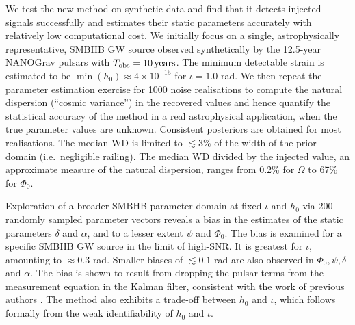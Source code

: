 \documentclass[fleqn,usenatbib,useAMS]{mnras}
\begin{document}
 We test the new method on synthetic data and find that it detects injected signals successfully and estimates their static parameters accurately with relatively low computational cost. We initially focus on a single, astrophysically representative, SMBHB GW source observed synthetically by the 12.5-year NANOGrav pulsars with $T_{\rm obs} = 10 \, {\rm years}$. The minimum detectable strain is estimated to be $\min(h_0) \approx 4 \times 10^{-15}$ for $\iota=1.0$ rad. We then repeat the parameter estimation exercise for 1000 noise realisations to compute the natural dispersion (``cosmic variance'') in the recovered values and hence quantify the statistical accuracy of the method in a real astrophysical application, when the true parameter values are unknown. Consistent posteriors are obtained for most realisations. The median WD is limited to $\lesssim 3\%$ of the width of the prior domain (i.e.\ negligible railing). The median WD divided by the injected value, an approximate measure of the natural dispersion, ranges from  0.2\% for $\Omega$ to 67\% for $\Phi_0$. \newline 
  
  
Exploration of a broader SMBHB parameter domain at fixed $\iota$ and $h_0$ via 200 randomly sampled parameter vectors reveals a bias in the estimates of the static parameters $\delta$ and $\alpha$, and to a lesser extent $\psi$ and $\Phi_0$. The bias is examined for a specific SMBHB GW source in the limit of high-SNR. It is greatest for $\iota$, amounting to $\approx 0.3$ rad.  Smaller biases of $\lesssim 0.1$ rad are also observed in $\Phi_0, \psi, \delta$ and $\alpha$. The bias is shown to result from dropping the pulsar terms from the measurement equation in the Kalman filter, consistent with the work of previous authors \citep{Zhupulsarterms,Chen2022}. The method also exhibits a trade-off between $h_0$ and $\iota$, which follows formally from the weak identifiability of $h_0$ and $\iota$. \newline 
 
\end{document}
